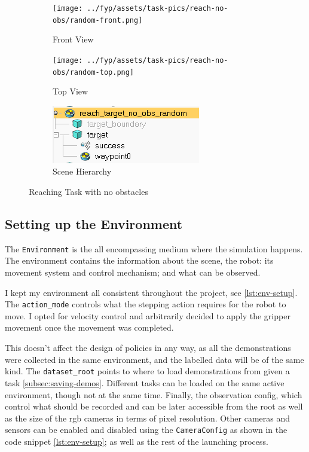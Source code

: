 \begin{figure}[htbp]
  \begin{subfigure}{0.48\linewidth}
    \centering
    \texttt{[image: ../fyp/assets/task-pics/reach-no-obs/random-front.png]}      
    \caption{Front View}
  \end{subfigure}%
  \hfill
  \begin{subfigure}{0.48\linewidth}
    \centering
    \texttt{[image: ../fyp/assets/task-pics/reach-no-obs/random-top.png]}
    \caption{Top View}
  \end{subfigure}
  \vspace{0.5em}
  \begin{subfigure}{1\linewidth}
    \centering
    \includegraphics[scale=0.5]{assets/early-work/random-scene-hierarchy.png}
    \caption{Scene Hierarchy}\label{fig:reach-no-obs-hierarchy}
  \end{subfigure}%
  \caption{Reaching Task with no obstacles}\label{fig:reach-no-obs}
\end{figure}

\subsection{Setting up the Environment}
The \verb|Environment| is the all encompassing medium where the simulation happens. The environment contains the information about the scene, the robot: its movement system and control mechanism; and what can be observed.

I kept my environment all consistent throughout the project, see \ref{lst:env-setup}. The \verb|action_mode| controls what the stepping action requires for the robot to move. I opted for velocity control and arbitrarily decided to apply the gripper movement once the movement was completed.

This doesn't affect the design of policies in any way, as all the demonstrations were collected in the same environment, and the labelled data will be of the same kind. The \verb|dataset_root| points to where to load demonstrations from given a task \ref{subsec:saving-demos}. Different tasks can be loaded on the same active environment, though not at the same time. Finally, the observation config, which control what should be recorded and can be later accessible from the root as well as the size of the rgb cameras in terms of pixel resolution. Other cameras and sensors can be enabled and disabled using the \verb|CameraConfig| as shown in the code snippet \ref{lst:env-setup}; as well as the rest of the launching process.


